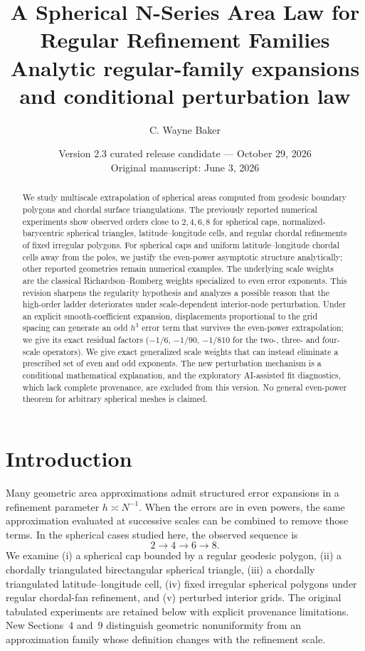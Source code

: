 \documentclass[11pt]{article}
\title{A Spherical N-Series Area Law for Regular Refinement Families\\[2pt]
\large Analytic regular-family expansions and conditional perturbation law}
\author{C. Wayne Baker}
\date{Version 2.3 curated release candidate --- October 29, 2026\\ Original manuscript: June 3, 2026}
\theoremstyle{remark}
\begin{document}
\maketitle

\begin{abstract}
We study multiscale extrapolation of spherical areas computed from geodesic boundary
polygons and chordal surface triangulations. The previously reported numerical experiments
show observed orders close to $2,4,6,8$ for spherical caps, normalized-barycentric spherical
triangles, latitude--longitude cells, and regular chordal refinements of fixed irregular
polygons. For spherical caps and uniform latitude--longitude chordal cells away from the poles,
we justify the even-power asymptotic structure analytically; other reported geometries remain
numerical examples. The underlying scale weights are the classical Richardson--Romberg weights
specialized to even error exponents. This revision sharpens the regularity hypothesis and
analyzes a possible reason that the high-order ladder deteriorates under scale-dependent
interior-node perturbation. Under an explicit smooth-coefficient expansion, displacements
proportional to the grid spacing can generate an odd $h^3$ error term that survives the
even-power extrapolation; we give its exact residual factors ($-1/6$, $-1/90$, $-1/810$ for
the two-, three- and four-scale operators). We give exact generalized scale weights that can
instead eliminate a prescribed set of even and odd exponents. The new perturbation mechanism
is a conditional mathematical explanation, and the exploratory AI-assisted fit diagnostics, which lack complete provenance, are excluded from this version. No general
even-power theorem for arbitrary spherical meshes is claimed.
\end{abstract}

\section{Introduction}
Many geometric area approximations admit structured error expansions in a refinement
parameter $h\asymp N^{-1}$. When the errors are in even powers, the same approximation
evaluated at successive scales can be combined to remove those terms. In the spherical
cases studied here, the observed sequence is
\[
2\longrightarrow 4\longrightarrow 6\longrightarrow 8 .
\]
We examine (i) a spherical cap bounded by a regular geodesic polygon, (ii) a chordally
triangulated birectangular spherical triangle, (iii) a chordally triangulated
latitude--longitude cell, (iv) fixed irregular spherical polygons under regular chordal-fan
refinement, and (v) perturbed interior grids. The original tabulated experiments are retained below with explicit provenance limitations.
New Sections~4 and~9 distinguish geometric nonuniformity from an approximation family whose
definition changes with the refinement scale.
\end{document}
